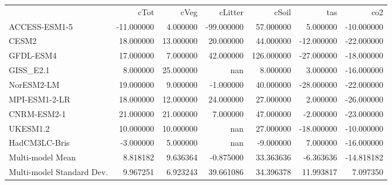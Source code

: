 \begin{tabular}{lrrrrrr}
 & cTot & cVeg & cLitter & cSoil & tas & co2 \\
ACCESS-ESM1-5 & -11.000000 & 4.000000 & -99.000000 & 57.000000 & 5.000000 & -10.000000 \\
CESM2 & 18.000000 & 13.000000 & 20.000000 & 44.000000 & -12.000000 & -22.000000 \\
GFDL-ESM4 & 17.000000 & 7.000000 & 42.000000 & 126.000000 & -27.000000 & -18.000000 \\
GISS_E2.1 & 8.000000 & 25.000000 & nan & 8.000000 & 3.000000 & -16.000000 \\
NorESM2-LM & 19.000000 & 9.000000 & -1.000000 & 40.000000 & -28.000000 & -22.000000 \\
MPI-ESM1-2-LR & 18.000000 & 12.000000 & 24.000000 & 27.000000 & 2.000000 & -26.000000 \\
CNRM-ESM2-1 & 21.000000 & 21.000000 & 7.000000 & 47.000000 & -2.000000 & -23.000000 \\
UKESM1.2 & 10.000000 & 10.000000 & nan & 27.000000 & -18.000000 & -10.000000 \\
HadCM3LC-Bris & -3.000000 & 5.000000 & nan & -9.000000 & 7.000000 & -16.000000 \\
Multi-model Mean & 8.818182 & 9.636364 & -0.875000 & 33.363636 & -6.363636 & -14.818182 \\
Multi-model Standard Dev. & 9.967251 & 6.923243 & 39.661086 & 34.396378 & 11.993817 & 7.097350 \\
\end{tabular}
